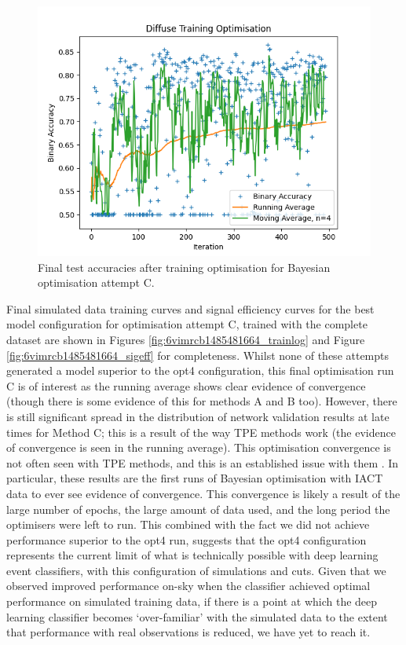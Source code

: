 \begin{figure}[h] 
        \centering \includegraphics[width=\columnwidth]{figures/convplot_longmoredata.png}

        \caption{
                \label{fig:convplot_longmoredata} Final test accuracies after training optimisation for Bayesian optimisation attempt C.
        }
\end{figure}

Final simulated data training curves and signal efficiency curves for the best model configuration for optimisation attempt C, trained with the complete dataset are shown in Figures \ref{fig:6vimrcb1485481664_trainlog} and Figure \ref{fig:6vimrcb1485481664_sigeff} for completeness. Whilst none of these attempts generated a model superior to the opt4 configuration, this final optimisation run C is of interest as the running average shows clear evidence of convergence (though there is some evidence of this for methods A and B too). However, there is still significant spread in the distribution of network validation results at late times for Method C; this is a result of the way TPE methods work (the evidence of convergence is seen in the running average). This optimisation convergence is not often seen with TPE methods, and this is an established issue with them \cite{autosklearn}. In particular, these results are the first runs of Bayesian optimisation with IACT data to ever see evidence of convergence. This convergence is likely a result of the large number of epochs, the large amount of data used, and the long period the optimisers were left to run. This combined with the fact we did not achieve performance superior to the opt4 run, suggests that the opt4 configuration represents the current limit of what is technically possible with deep learning event classifiers, with this configuration of simulations and cuts. Given that we observed improved performance on-sky when the classifier achieved optimal performance on simulated training data, if there is a point at which the deep learning classifier becomes `over-familiar' with the simulated data to the extent that performance with real observations is reduced, we have yet to reach it.

